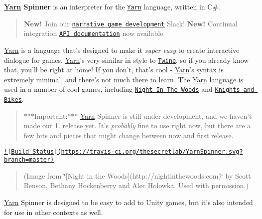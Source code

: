 

{\bfseries \hyperlink{a00026}{Yarn} Spinner} is an interpreter for the \href{https://github.com/infiniteammoinc/Yarn}{\tt Yarn} language, written in C\#.

\begin{quotation}
{\bfseries New!} Join our \href{http://lab.to/narrativegamedev}{\tt narrative game development} Slack! {\bfseries New!} Continual integration \href{https://thesecretlab.github.io/YarnSpinner/html/}{\tt A\-P\-I documentation} now available

\end{quotation}


\hyperlink{a00026}{Yarn} is a language that's designed to make it {\itshape super easy} to create interactive dialogue for games. \hyperlink{a00026}{Yarn}'s very similar in style to \href{http://twinery.org}{\tt Twine}, so if you already know that, you'll be right at home! If you don't, that's cool -\/ \hyperlink{a00026}{Yarn}'s syntax is extremely minimal, and there's not much there to learn. The \hyperlink{a00026}{Yarn} language is used in a number of cool games, including \href{http://nightinthewoods.com}{\tt Night In The Woods} and \href{https://www.kickstarter.com/projects/foamsword/knights-and-bikes}{\tt Knights and Bikes}.

\begin{quotation}
$\ast$$\ast$$\ast$\-Important\-:$\ast$$\ast$$\ast$ \hyperlink{a00026}{Yarn} Spinner is still under development, and we haven't made our 1. release yet. It's {\itshape probably} fine to use right now, but there are a few bits and pieces that might change between now and first release.

\end{quotation}


\href{https://travis-ci.org/thesecretlab/YarnSpinner}{\tt !\mbox{[}Build Status\mbox{]}(https\-://travis-\/ci.\-org/thesecretlab/\-Yarn\-Spinner.\-svg?branch=master)}



\begin{quotation}
(Image from \char`\"{}\mbox{[}\-Night in the Woods\mbox{]}(http\-://nightinthewoods.\-com)\char`\"{} by Scott Benson, Bethany Hockenberry and Alec Holowka. Used with permission.)

\end{quotation}


\hyperlink{a00026}{Yarn} Spinner is designed to be easy to add to Unity games, but it's also intended for use in other contexts as well.


